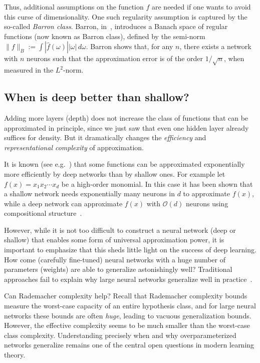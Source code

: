 Thus, additional assumptions on the function $f$ are needed if one wants to avoid this curse of dimensionality. One such regularity assumption is captured by the so-called {\em Barron class}.
Barron, in~\cite{barron2002universal}, introduces a Banach space of regular functions (now known as Barron class), defined by the semi-norm
$\|f\|_B:= \int |\hat{f}(\omega) | |\omega| \,d\omega$. Barron shows that, for any $n$, there exists a network with $n$
neurons such that the approximation error is of the order $1/\sqrt{n}$, when measured in the $L^2$-norm.







\subsection{When is deep  better than shallow?}

Adding more layers (depth) does not increase the class of functions that can be approximated in principle, since we just saw that even one hidden layer already suffices for density. 
But it dramatically changes the {\em efficiency} and {\em representational complexity} of approximation.



It is known (see e.g.~\cite{poggio2017and,yarotsky2017error,telgarsky2016benefits})
that some functions can be approximated exponentially more efficiently by deep networks than by shallow ones. For example
let $f(x) = x_1 x_2 \cdots x_d$ be a high-order monomial. In this case it has been shown that a shallow network needs exponentially many neurons in $d$ to approximate $f(x)$, while a deep network can approximate $f(x)$ with ${\mathcal O}(d)$ neurons using compositional structure~\cite{poggio2017and}. 

However, while it is not too difficult to construct a neural network (deep or shallow) that enables some form of universal approximation power, it is important to emphasize that this sheds little light on the success of deep learning. How come (carefully fine-tuned) neural networks with a huge number of parameters (weights) are able to generalize astonishingly well?  Traditional approaches fail to explain why large neural networks generalize well in practice~\cite{zhang2016understanding,zhang2021understanding}. 

Can Rademacher complexity help?
Recall that Rademacher complexity bounds measure the worst-case capacity of an entire hypothesis class, and for large neural networks these bounds are often {\em huge}, leading to vacuous generalization bounds.
However, the effective complexity seems to be much smaller than the worst-case class complexity. Understanding precisely when and why overparameterized networks generalize remains one of the central open questions in modern learning theory.




